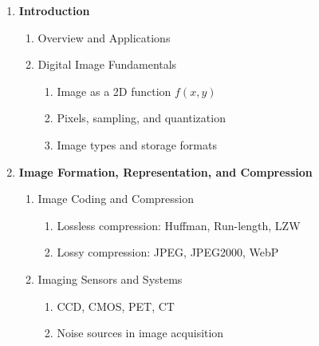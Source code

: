 \documentclass[a4paper,10pt]{article}
\begin{document}
\begin{enumerate}[label=\Roman*.]
    \item \textbf{Introduction}
    \begin{enumerate}[label=\alph*.]
        \item Overview and Applications
        \item Digital Image Fundamentals
        \begin{enumerate}[label=\roman*.]
            \item Image as a 2D function $f(x, y)$
            \item Pixels, sampling, and quantization
            \item Image types and storage formats
        \end{enumerate}
    \end{enumerate}

    \item \textbf{Image Formation, Representation, and Compression}
    \begin{enumerate}[label=\alph*.]
        \item Image Coding and Compression
        \begin{enumerate}[label=\roman*.]
            \item Lossless compression: Huffman, Run-length, LZW
            \item Lossy compression: JPEG, JPEG2000, WebP
        \end{enumerate}
        \item Imaging Sensors and Systems
        \begin{enumerate}[label=\roman*.]
            \item CCD, CMOS, PET, CT
            \item Noise sources in image acquisition
        \end{enumerate}
    \end{enumerate}


\end{enumerate}
\end{document}
